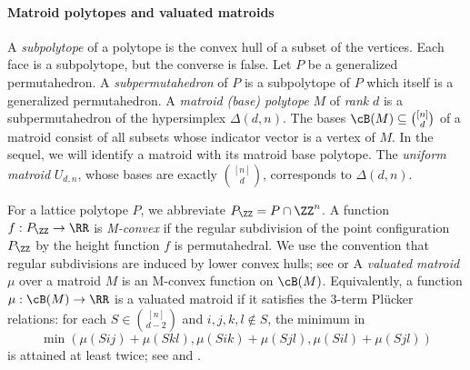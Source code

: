
\paragraph{Matroid polytopes and valuated matroids} A \emph{subpolytope} of a polytope is the convex hull of a subset of the vertices.
Each face is a subpolytope, but the converse is false.
Let $P$ be a generalized permutahedron.
A \emph{subpermutahedron} of $P$ is a subpolytope of $P$ which itself is a generalized permutahedron.
A \emph{matroid (base) polytope} $M$ of \emph{rank} $d$ is a subpermutahedron of the hypersimplex $\Delta(d,n)$. 
The bases $\cB(M) \subseteq \binom{[n]}{d}$ of a matroid consist of all subsets whose indicator vector is a vertex of $M$.
In the sequel, we will identify a matroid with its matroid base polytope. 
The \emph{uniform matroid} $U_{d,n}$, whose bases are exactly $\binom{[n]}{d}$, corresponds to $\Delta(d,n)$.

For a lattice polytope $P$, we abbreviate $P_\ZZ=P\cap\ZZ^n$.
A function $f:P_\ZZ\to\RR$ is \emph{M-convex} if the regular subdivision of the point configuration $P_\ZZ$ by the height function $f$ is permutahedral.
We use the convention that regular subdivisions are induced by lower convex hulls; see \cite{Triangulations} or \cite[\S1.2]{ETC}
A \emph{valuated matroid} $\mu$ over a matroid $M$ is an M-convex function on $\cB(M)$. 
Equivalently, a function $\mu:\cB(M)\to \RR$ is a valuated matroid if it satisfies the 3-term Pl\"ucker relations:
for each $S\in \binom{[n]}{d-2}$ and $i,j,k,l \notin S$, the minimum in
\[
\min(\mu(Sij) + \mu(Skl),\mu(Sik) + \mu(Sjl),\mu(Sil) + \mu(Sjl))
\]
is attained at least twice; see \cite[\S4.4]{Tropical+Book} and \cite[\S10.4]{ETC}.

